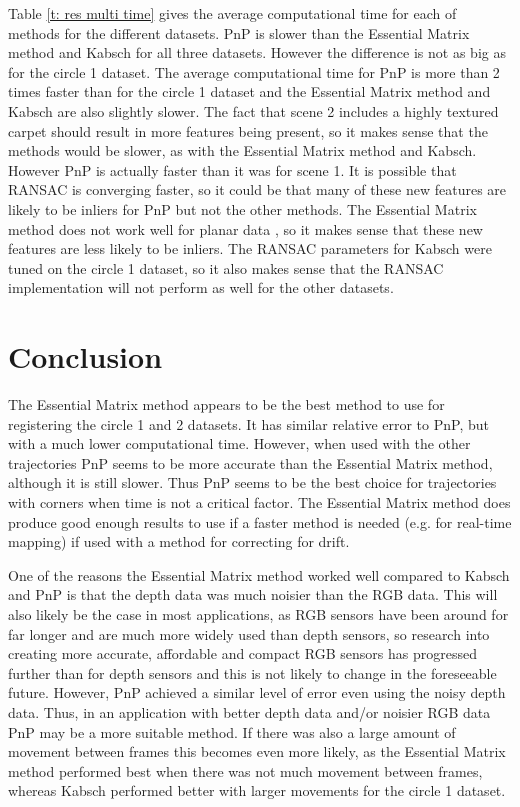 \documentclass[12pt,a4paper]{article}
\begin{document}
    Table \ref{t: res multi time} gives the average computational time for each of methods for the different datasets. PnP is slower than the Essential Matrix method and Kabsch for all three datasets. However the difference is not as big as for the circle 1 dataset. The average computational time for PnP is more than 2 times faster than for the circle 1 dataset and the Essential Matrix method and Kabsch are also slightly slower. The fact that scene 2 includes a highly textured carpet should result in more features being present, so it makes sense that the methods would be slower, as with the Essential Matrix method and Kabsch. However PnP is actually faster than it was for scene 1. It is possible that RANSAC is converging faster, so it could be that many of these new features are likely to be inliers for PnP but not the other methods. The Essential Matrix method does not work well for planar data \cite{mur2015orb}, so it makes sense that these new features are less likely to be inliers. The RANSAC parameters for Kabsch were tuned on the circle 1 dataset, so it also makes sense that the RANSAC implementation will not perform as well for the other datasets. %


\section{Conclusion}
  \label{sec: conclusion}
  The Essential Matrix method appears to be the best method to use for registering the circle 1 and 2 datasets. It has similar relative error to PnP, but with a much lower computational time. However, when used with the other trajectories PnP seems to be more accurate than the Essential Matrix method, although it is still slower. Thus PnP seems to be the best choice for trajectories with corners when time is not a critical factor. The Essential Matrix method does produce good enough results to use if a faster method is needed (e.g. for real-time mapping) if used with a method for correcting for drift. 
   
  One of the reasons the Essential Matrix method worked well compared to Kabsch and PnP is that the depth data was much noisier than the RGB data. This will also likely be the case in most applications, as RGB sensors have been around for far longer and are much more widely used than depth sensors, so research into creating more accurate, affordable and compact RGB sensors has progressed further than for depth sensors and this is not likely to change in the foreseeable future. However, PnP achieved a similar level of error even using the noisy depth data. Thus, in an application with better depth data and/or noisier RGB data PnP may be a more suitable method. If there was also a large amount of movement between frames this becomes even more likely, as the Essential Matrix method performed best when there was not much movement between frames, whereas Kabsch performed better with larger movements for the circle 1 dataset.
   
\end{document}
